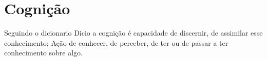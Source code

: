 
\chapter{Cognição}%
\label{cap:aprendizagem}

\begin{definition}[Cognição:]
Seguindo o dicionario Dicio \cite{diciocognicao} a cognição é 
capacidade de discernir, de assimilar esse conhecimento; 
Ação de conhecer, de perceber, de ter ou de passar a ter conhecimento sobre algo.
\end{definition}











